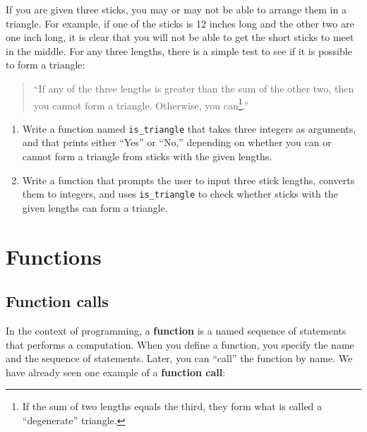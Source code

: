\documentclass[10pt]{book}
\begin{document}
\begin{ex}

If you are given three sticks, you may or may not be able to arrange
them in a triangle.  For example, if one of the sticks is 12 inches
long and the other two are one inch long, it is clear that you will
not be able to get the short sticks to meet in the middle.  For any
three lengths, there is a simple test to see if it is possible to form
a triangle:

\begin{quotation}
``If any of the three lengths is greater than the sum of the other
  two, then you cannot form a triangle.  Otherwise, you
  can\footnote{If the sum of two lengths equals the third, they form
    what is called a ``degenerate'' triangle.}.''
\end{quotation}

\begin{enumerate}

\item Write a function named \verb"is_triangle" that takes three
  integers as arguments, and that prints either ``Yes'' or ``No,'' depending
  on whether you can or cannot form a triangle from sticks with the
  given lengths.

\item Write a function that prompts the user to input three stick
  lengths, converts them to integers, and uses \verb"is_triangle" to
  check whether sticks with the given lengths can form a triangle.

\end{enumerate}

\end{ex}

\chapter{Functions}
\label{funcchap}

\section{Function calls}
\label{functionchap}

In the context of programming, a {\bf function} is a named sequence of
statements that performs a computation.  When you define a function,
you specify the name and the sequence of statements.  Later, you can
``call'' the function by name.  
We have already seen one example of a {\bf function call}:
\end{document}
